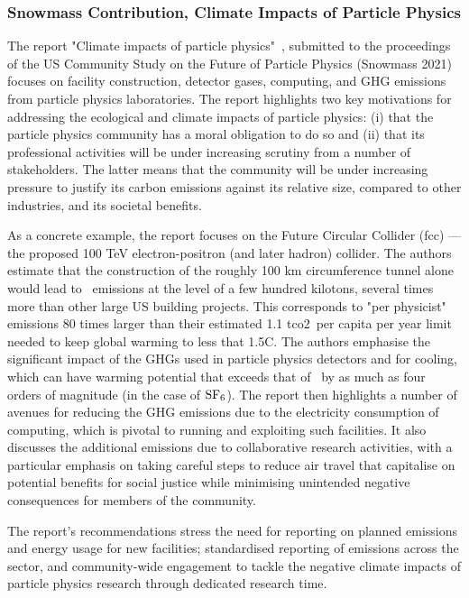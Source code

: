 \documentclass[../SustainableHEP.tex]{subfiles}
\begin{document}

\subsubsection{Snowmass Contribution, Climate Impacts of Particle Physics}

The report "Climate impacts of particle physics"~\cite{Bloom:2022gux}, submitted to the proceedings of the US Community Study on the Future of Particle Physics (Snowmass 2021) focuses on facility construction, detector gases, computing, and GHG emissions from particle physics laboratories. 
The report highlights two key motivations for addressing the ecological and climate impacts of particle physics: (i) that the particle physics community has a moral obligation to do so and (ii) that its professional activities will be under increasing scrutiny from a number of stakeholders. 
The latter means that the community will be under increasing pressure to justify its carbon emissions against its relative size, compared to other industries, and its societal benefits.

As a concrete example, the report focuses on the Future Circular Collider (\acrshort{fcc}) --- the proposed 100 TeV electron-positron (and later hadron) collider. 
The authors estimate that the construction of the roughly 100 km circumference tunnel alone would lead to \CdO\ emissions at the level of a few hundred kilotons, several times more than other large US building projects.
This corresponds to "per physicist" emissions 80 times larger than their estimated 1.1 \acrshort{tco2}\ per capita per year limit needed to keep global warming to less that 1.5\degree C. The authors emphasise the significant impact of the GHGs used in particle physics detectors and for cooling, which can have warming potential that exceeds that of \CdO\ by as much as four orders of magnitude (in the case of ${\rm SF}_6$).  
The report then highlights a number of avenues for reducing the GHG emissions due to the electricity consumption of computing, which is pivotal to running and exploiting such facilities. It also discusses the additional emissions due to collaborative research activities, with a particular emphasis on taking careful steps to reduce air travel that capitalise on potential benefits for social justice while minimising unintended negative consequences for members of the community.

The report's recommendations stress the need for reporting on planned emissions and energy usage for new facilities; standardised reporting of emissions across the sector, and community-wide engagement to tackle the negative climate impacts of particle physics research through dedicated research time.
\end{document}

